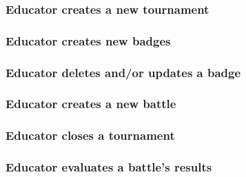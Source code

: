 \documentclass{article}
\begin{document}
{\begin{itemize}
    \subsubsection{Educator creates a new tournament}
        \begin{figure}[H]
            \centering
            \caption{}
            \label{fig:}
        \end{figure}
    \subsubsection{Educator creates new badges}
        \begin{figure}[H]
            \centering
            \caption{}
            \label{fig:}
        \end{figure}
    \subsubsection{Educator deletes and/or updates a badge}
        \begin{figure}[H]
            \centering
            \caption{}
            \label{fig:}
        \end{figure}
    \subsubsection{Educator creates a new battle}
        \begin{figure}[H]
            \centering
            \caption{}
            \label{fig:}
        \end{figure}
    \subsubsection{Educator closes a tournament}
        \begin{figure}[H]
            \centering
            \caption{}
            \label{fig:}
        \end{figure}
    \subsubsection{Educator evaluates a battle's results}
        \begin{figure}[H]
            \centering
            \caption{}
            \label{fig:}
        \end{figure}

\end{itemize}}
\end{document}
